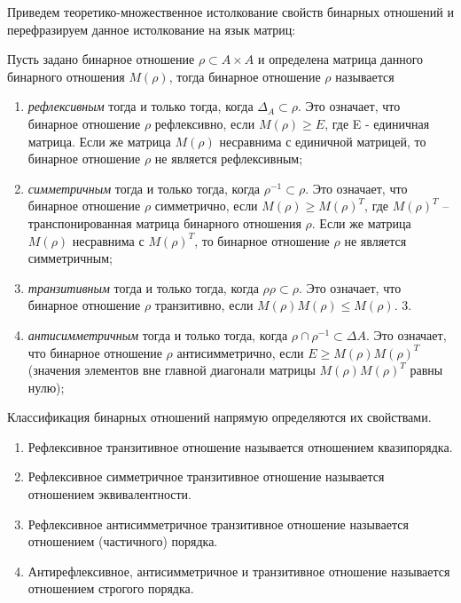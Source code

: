 \documentclass[spec, och, labwork]{shiza}
\begin{document}
        Приведем теоретико-множественное истолкование свойств бинарных отношений и перефразируем данное истолкование на язык матриц:
        
        Пусть задано бинарное отношение $\rho \subset A \times A$ и определена матрица данного бинарного отношения $M(\rho)$, тогда бинарное отношение $\rho$ называется

        \begin{enumerate}
            \item \textit{рефлексивным} тогда и только тогда, когда $\Delta_A \subset \rho$. Это означает, что бинарное
            отношение $\rho$ рефлексивно, если $M(\rho) \geq E$, где E - единичная матрица. Если же матрица $M(\rho)$ 
            несравнима с единичной матрицей, то бинарное отношение $\rho$ не является рефлексивным;
            \item \textit{симметричным} тогда и только тогда, когда $\rho^{-1} \subset \rho$. Это означает, что бинарное 
            отношение $\rho$ симметрично, если $M(\rho) \geq M(\rho)^T$, где $M(\rho)^T$ – транспонированная матрица 
            бинарного отношения $\rho$. Если же матрица $M(\rho)$ несравнима с $M(\rho)^T$, то бинарное отношение $\rho$
            не является симметричным;
            \item \textit{транзитивным} тогда и только тогда, когда $\rho \rho \subset \rho$. Это означает, что бинарное
            отношение $\rho$ транзитивно, если $M(\rho)M(\rho) \leq M(\rho)$.
            3. \item \textit{антисимметричным} тогда и только тогда, когда $\rho \cap \rho^{-1} \subset \Delta A$. Это означает, что бинарное отношение $\rho$ 
            антисимметрично, если $E \geq M(\rho) M(\rho)^T$ (значения элементов вне главной диагонали матрицы $M(\rho) M(\rho)^T$ равны нулю);
        \end{enumerate}

        Классификация бинарных отношений напрямую определяются их свойствами.

        \begin{enumerate}
            \item Рефлексивное транзитивное отношение называется отношением квазипорядка.
            \item Рефлексивное симметричное транзитивное отношение называется отношением эквивалентности.
            \item Рефлексивное антисимметричное транзитивное отношение называется отношением (частичного) порядка.
            \item Антирефлексивное, антисимметричное и транзитивное отношение называется отношением строгого порядка.
        \end{enumerate}
\end{document}
